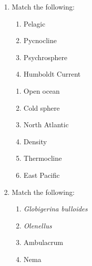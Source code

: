 \documentclass[journal,12pt,onecolumn]{IEEEtran}
\theoremstyle{remark}
\begin{document}
\begin{enumerate}
    \item Match the following: \hfill{} 
    
    \begin{multicols}{2}
            \begin{enumerate}[start=16]
                \item Pelagic
                \item Pycnocline
                \item Psychrosphere
                \item Humboldt Current
            \end{enumerate}
            
            \columnbreak
            
            

            \begin{enumerate} 
                \item Open ocean
                \item Cold sphere
                \item North Atlantic
                \item Density
                \item Thermocline
                \item East Pacific
            \end{enumerate}            

        \end{multicols}
            \begin {enumerate}
            \end{enumerate}
    \item Match the following: \hfill{} 
        
    \begin{multicols}{2}
            \begin{enumerate}[start=16]
                \item \textit{Globigerina bulloides}
                \item \textit{Olenellus}
                \item Ambulacrum
                \item Nema
            \end{enumerate}
            \columnbreak
            

\end{multicols}
\end{enumerate}
\end{document}
